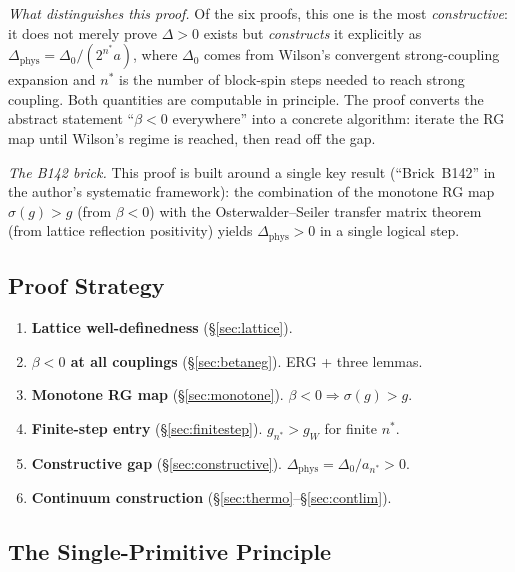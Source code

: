 \documentclass[12pt,a4paper]{article}
\theoremstyle{plain}
\theoremstyle{definition}
\theoremstyle{remark}
\begin{document}
\textit{What distinguishes this proof.} Of the six proofs, this one is the most \emph{constructive}: it does not merely prove $\Delta>0$ exists but \emph{constructs} it explicitly as $\Delta_{\mathrm{phys}}=\Delta_0/(2^{n^*}a)$, where $\Delta_0$ comes from Wilson's convergent strong-coupling expansion and $n^*$ is the number of block-spin steps needed to reach strong coupling. Both quantities are computable in principle. The proof converts the abstract statement ``$\beta<0$ everywhere'' into a concrete algorithm: iterate the RG map until Wilson's regime is reached, then read off the gap.

\textit{The B142 brick.} This proof is built around a single key result (``Brick~B142'' in the author's systematic framework): the combination of the monotone RG map $\sigma(g)>g$ (from $\beta<0$) with the Osterwalder--Seiler transfer matrix theorem (from lattice reflection positivity) yields $\Delta_{\mathrm{phys}}>0$ in a single logical step.

\subsection{Proof Strategy}\label{sec:strategy}

\begin{enumerate}[label=\textbf{S\arabic*},leftmargin=3em]
\item \textbf{Lattice well-definedness} (\S\ref{sec:lattice}).
\item \textbf{$\beta<0$ at all couplings} (\S\ref{sec:betaneg}). ERG + three lemmas.
\item \textbf{Monotone RG map} (\S\ref{sec:monotone}). $\beta<0\Rightarrow\sigma(g)>g$.
\item \textbf{Finite-step entry} (\S\ref{sec:finitestep}). $g_{n^*}>g_W$ for finite $n^*$.
\item \textbf{Constructive gap} (\S\ref{sec:constructive}). $\Delta_{\mathrm{phys}}=\Delta_0/a_{n^*}>0$.
\item \textbf{Continuum construction} (\S\ref{sec:thermo}--\S\ref{sec:contlim}).
\end{enumerate}

\subsection{The Single-Primitive Principle}\label{sec:primitive}
\end{document}
